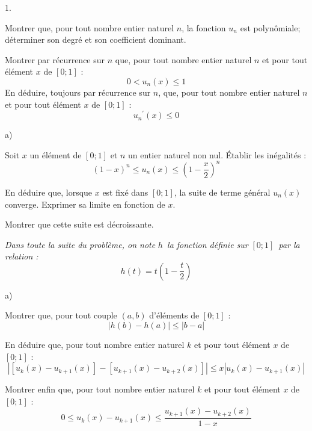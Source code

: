 \documentclass[11pt]{article}%
\begin{document}
\begin{noliste}{1.}
 \setlength{\itemsep}{4mm}
\item Montrer que, pour tout nombre entier naturel $n$, la fonction
$u_{n}$
est polynômiale; déterminer son degré et son coefficient dominant.

\item Montrer par récurrence sur $n$ que, pour tout nombre entier
naturel $n$
et pour tout élément $x$ de $[0;1]$ : 
\[
0<u_{n}(x)\leq 1
\]
En déduire, toujours par récurrence sur $n$, que, pour tout nombre
entier
naturel $n$ et pour tout élément $x$ de $[0;1]$ : 
\[
u_{n}{^{\prime }}(x)\leq 0
\]

\item 

\begin{noliste}{a)}
 \setlength{\itemsep}{2mm}
\item Soit $x$ un élément de $[0;1]$ et $n$ un entier naturel non nul.
Établir les inégalités : 
\[
(1-x)^{n}\leq u_{n}(x)\leq \left( 1-\dfrac{x}{2}\right) ^{n}
\]

\item En déduire que, lorsque $x$ est fixé dans $[0;1]$, la suite de
terme général $u_{n}(x)$ converge. Exprimer sa limite en fonction de
$x$.

\item Montrer que cette suite est décroissante.
\end{noliste}

\emph{Dans toute la suite du problème, on note }$h$\emph{\ la fonction
définie sur }$[0;1]$\emph{\ par la relation :} 
\[
h(t) = t\left( 1-\dfrac{t}{2}\right)
\]

\item 

\begin{noliste}{a)}
 \setlength{\itemsep}{2mm}
\item Montrer que, pour tout couple $(a,b)$ d'éléments de $[0;1]$ : 
\[
\left| h(b)-h(a)\right| \leq \left| b-a\right|
\]

\item En déduire que, pour tout nombre entier naturel $k$ et pour tout
élément $x$ de $[0;1]$ : 
\[
\left| \left[ u_{k}(x)-u_{k + 1}(x)\right] -\left[ u_{k + 1}(x)-u_{k +
2}(x)\right] \right| \leq x\left| u_{k}(x)-u_{k + 1}(x)\right|
\]

\item Montrer enfin que, pour tout nombre entier naturel $k$ et pour
tout élément $x$ de $[0;1]$ : 
\[
0\leq u_{k}(x)-u_{k + 1}(x)\leq \dfrac{u_{k + 1}(x)-u_{k + 2}(x)}{1-x}
\]
\end{noliste}


\end{noliste}
\end{document}

